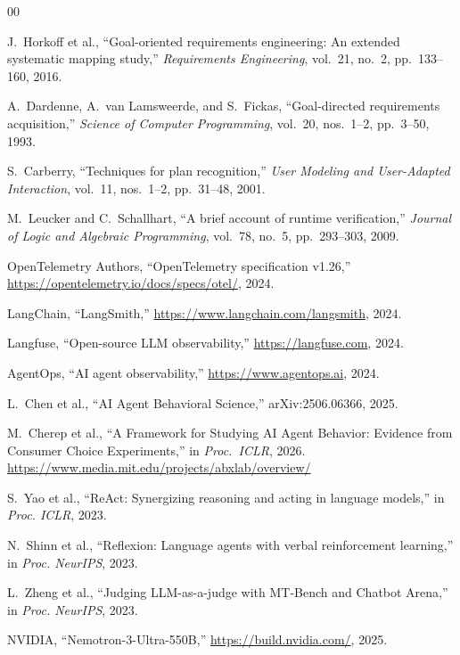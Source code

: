 \documentclass[conference]{IEEEtran}
\begin{document}
\begin{thebibliography}{00}

J.~Horkoff et al., ``Goal-oriented requirements engineering: An extended systematic
mapping study,'' \emph{Requirements Engineering}, vol.~21, no.~2, pp.~133--160, 2016.

A.~Dardenne, A.~van Lamsweerde, and S.~Fickas, ``Goal-directed requirements
acquisition,'' \emph{Science of Computer Programming}, vol.~20, nos.~1--2,
pp.~3--50, 1993.

S.~Carberry, ``Techniques for plan recognition,'' \emph{User Modeling and User-Adapted
Interaction}, vol.~11, nos.~1--2, pp.~31--48, 2001.

M.~Leucker and C.~Schallhart, ``A brief account of runtime verification,'' \emph{Journal
of Logic and Algebraic Programming}, vol.~78, no.~5, pp.~293--303, 2009.

OpenTelemetry Authors, ``OpenTelemetry specification v1.26,''
\url{https://opentelemetry.io/docs/specs/otel/}, 2024.

LangChain, ``LangSmith,'' \url{https://www.langchain.com/langsmith}, 2024.

Langfuse, ``Open-source LLM observability,'' \url{https://langfuse.com}, 2024.

AgentOps, ``AI agent observability,'' \url{https://www.agentops.ai}, 2024.

L.~Chen et al., ``AI Agent Behavioral Science,'' arXiv:2506.06366, 2025.

M.~Cherep et al., ``A Framework for Studying AI Agent Behavior: Evidence from Consumer
Choice Experiments,'' in \emph{Proc.\ ICLR}, 2026.
\url{https://www.media.mit.edu/projects/abxlab/overview/}

S.~Yao et al., ``ReAct: Synergizing reasoning and acting in language models,'' in
\emph{Proc. ICLR}, 2023.

N.~Shinn et al., ``Reflexion: Language agents with verbal reinforcement learning,'' in
\emph{Proc. NeurIPS}, 2023.

L.~Zheng et al., ``Judging LLM-as-a-judge with MT-Bench and Chatbot Arena,'' in
\emph{Proc. NeurIPS}, 2023.

NVIDIA, ``Nemotron-3-Ultra-550B,'' \url{https://build.nvidia.com/}, 2025.

\end{thebibliography}
\end{document}
